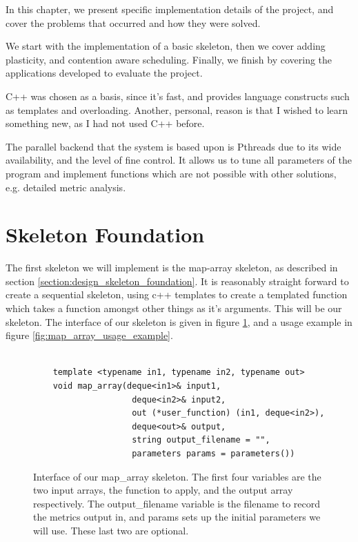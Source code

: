 
In this chapter, we present specific implementation details of the project, and cover the problems that occurred and how they were solved.

We start with the implementation of a basic skeleton, then  we cover adding plasticity, and contention aware scheduling. Finally, we finish by covering the applications developed to evaluate the project.

C++ was chosen as a basis, since it's fast, and provides language constructs such as templates and overloading. Another, personal, reason is that I wished to learn something new, as I had not used C++ before. 

The parallel backend that the system is based upon is Pthreads due to its wide availability, and the level of fine control. It allows us to tune all parameters of the program and implement functions which are not possible with other solutions, e.g. detailed metric analysis. 



\section{Skeleton Foundation}
\label{section:implementation_skeleton_foundation}

The first skeleton we will implement is the map-array skeleton, as described in section \ref{section:design_skeleton_foundation}. It is reasonably straight forward to create a sequential skeleton, using c++ templates to create a templated function which takes a function amongst other things as it's arguments. This will be our skeleton. The interface of our skeleton is given in figure \ref{fig:map_array_interface}, and a usage example in figure \ref{fig:map_array_usage_example}.



\begin{figure}
	\begin{lstlisting}

	template <typename in1, typename in2, typename out>
	void map_array(deque<in1>& input1, 
				   	deque<in2>& input2, 
				   	out (*user_function) (in1, deque<in2>), 
				   	deque<out>& output, 
				   	string output_filename = "", 
				   	parameters params = parameters())

	\end{lstlisting}

	\caption{Interface of our map\_array skeleton. The first four variables are the two input arrays, the function to apply, and the output array respectively. The output\_filename variable is the filename to record the metrics output in, and params sets up the initial parameters we will use. These last two are optional.}
	\label{fig:map_array_interface}
\end{figure}



